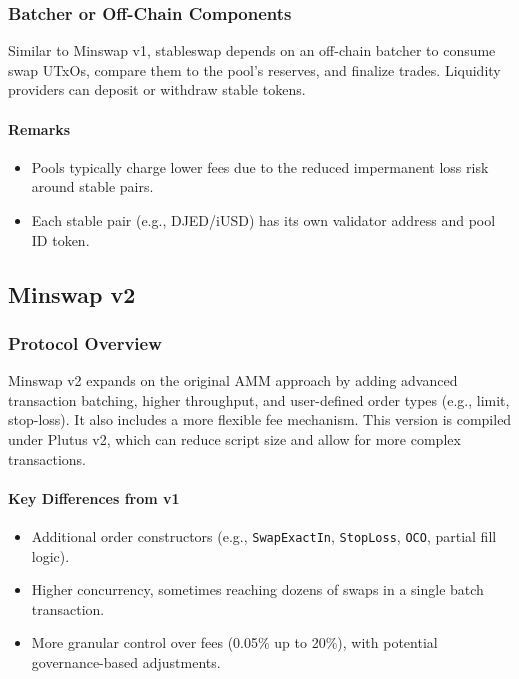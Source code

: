 \documentclass{article}
\begin{document}
\subsubsection{Batcher or Off-Chain Components}
Similar to Minswap v1, stableswap depends on an off-chain batcher to consume swap UTxOs, compare them to the pool’s reserves, and finalize trades. Liquidity providers can deposit or withdraw stable tokens. 

\paragraph{Remarks}
\begin{itemize}
    \item Pools typically charge lower fees due to the reduced impermanent loss risk around stable pairs.
    \item Each stable pair (e.g., DJED/iUSD) has its own validator address and pool ID token.
\end{itemize}



\subsection{Minswap v2}
\label{sec:minswap_v2}

\subsubsection{Protocol Overview}
Minswap v2 expands on the original AMM approach by adding advanced transaction batching, higher throughput, and user-defined order types (e.g., limit, stop-loss). It also includes a more flexible fee mechanism. This version is compiled under Plutus v2, which can reduce script size and allow for more complex transactions.

\paragraph{Key Differences from v1}
\begin{itemize}
    \item Additional order constructors (e.g., \texttt{SwapExactIn}, \texttt{StopLoss}, \texttt{OCO}, partial fill logic).
    \item Higher concurrency, sometimes reaching dozens of swaps in a single batch transaction.
    \item More granular control over fees (0.05\% up to 20\%), with potential governance-based adjustments.
\end{itemize}
\end{document}
